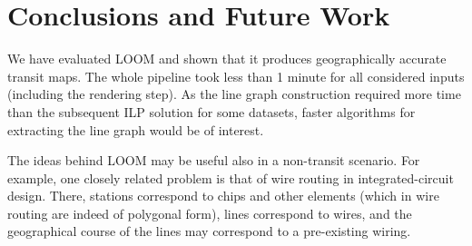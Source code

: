 \documentclass[sigconf]{acmart}
\newcommand\TODO[1]{\textcolor{blue}{\small [TODO: #1]}}
\begin{document}
\section{Conclusions and Future Work}\label{SEC:conclusions}

We have evaluated LOOM and shown that it produces geographically accurate transit maps. The whole pipeline took less than 1 minute for all considered inputs (including the rendering step).
As the line graph construction required more time than the subsequent ILP solution for some datasets, faster algorithms for extracting the line graph would be of interest.

The ideas behind LOOM may be useful also in a non-transit scenario.
For example, one closely related problem is that of wire routing in integrated-circuit design.
There, stations correspond to chips and other elements (which in wire routing are indeed of polygonal form), lines correspond to wires, and the geographical course of the lines may correspond to a pre-existing wiring.

%
%
%



\end{document}
